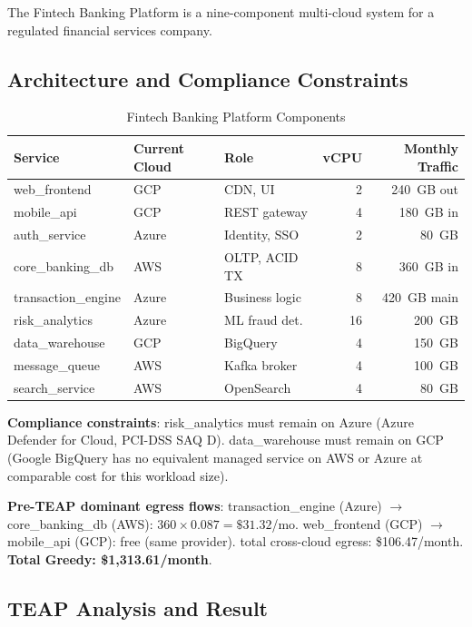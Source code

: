 \documentclass[10pt,journal]{IEEEtran}
\begin{document}
The Fintech Banking Platform is a nine-component multi-cloud system for a
regulated financial services company.

\subsection{Architecture and Compliance Constraints}

\begin{table}[ht]
\centering
\caption{Fintech Banking Platform Components}
\label{tab:fintech_specs}
\setlength{\tabcolsep}{3.5pt}
\begin{tabular}{lllrr}
\toprule
Service & Current Cloud & Role & vCPU & Monthly Traffic\\
\midrule
web\_frontend       & GCP   & CDN, UI        & 2  & 240~GB out\\
mobile\_api         & GCP   & REST gateway   & 4  & 180~GB in\\
auth\_service       & Azure & Identity, SSO  & 2  & 80~GB\\
core\_banking\_db   & AWS   & OLTP, ACID TX  & 8  & 360~GB in\\
transaction\_engine & Azure & Business logic & 8  & 420~GB main\\
risk\_analytics     & Azure & ML fraud det.  & 16 & 200~GB\\
data\_warehouse     & GCP   & BigQuery       & 4  & 150~GB\\
message\_queue      & AWS   & Kafka broker   & 4  & 100~GB\\
search\_service     & AWS   & OpenSearch     & 4  & 80~GB\\
\bottomrule
\end{tabular}
\end{table}

\textbf{Compliance constraints}:
risk\_analytics must remain on Azure (Azure Defender for Cloud, PCI-DSS SAQ D).
data\_warehouse must remain on GCP (Google BigQuery has no equivalent managed
service on AWS or Azure at comparable cost for this workload size).

\textbf{Pre-TEAP dominant egress flows}:
transaction\_engine (Azure) $\to$ core\_banking\_db (AWS): $360 \times 0.087 = \$31.32$/mo.
web\_frontend (GCP) $\to$ mobile\_api (GCP): free (same provider).
total cross-cloud egress: \$106.47/month.
\textbf{Total Greedy: \$1,313.61/month}.

\subsection{TEAP Analysis and Result}
\end{document}

